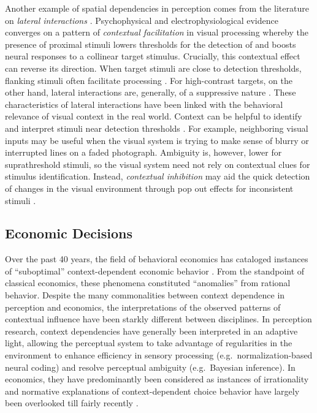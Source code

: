 \documentclass[a4paper, nobind]{templates/ociamthesis}
\begin{document}
Another example of spatial dependencies in perception comes from the literature on \emph{lateral interactions} \autocite{stemmler1995}. Psychophysical and electrophysiological evidence converges on a pattern of \emph{contextual facilitation} in visual processing whereby the presence of proximal stimuli lowers thresholds for the detection of \autocite{kapadia1995,freeman2001,freeman2005} and boosts neural responses to \autocite{kapadia1995,ito1999} a collinear target stimulus. Crucially, this contextual effect can reverse its direction. When target stimuli are close to detection thresholds, flanking stimuli often facilitate processing \autocite{polat1993}. For high-contrast targets, on the other hand, lateral interactions are, generally, of a suppressive nature \autocite{stemmler1995}. These characteristics of lateral interactions have been linked with the behavioral relevance of visual context in the real world. Context can be helpful to identify and interpret stimuli near detection thresholds \autocite{gilbert2000}. For example, neighboring visual inputs may be useful when the visual system is trying to make sense of blurry or interrupted lines on a faded photograph. Ambiguity is, however, lower for suprathreshold stimuli, so the visual system need not rely on contextual clues for stimulus identification. Instead, \emph{contextual inhibition} may aid the quick detection of changes in the visual environment through pop out effects for inconsistent stimuli \autocite{stemmler1995}.

\hypertarget{economic-decisions}{%
\subsection{Economic Decisions}\label{economic-decisions}}

Over the past 40 years, the field of behavioral economics has cataloged instances of ``suboptimal'' context-dependent economic behavior \autocite{thaler2015}. From the standpoint of classical economics, these phenomena constituted ``anomalies'' from rational behavior. Despite the many commonalities between context dependence in perception and economics, the interpretations of the observed patterns of contextual influence have been starkly different between disciplines. In perception research, context dependencies have generally been interpreted in an adaptive light, allowing the perceptual system to take advantage of regularities in the environment to enhance efficiency in sensory processing (e.g.~normalization-based neural coding) and resolve perceptual ambiguity (e.g.~Bayesian inference). In economics, they have predominantly been considered as instances of irrationality \autocite{kahneman1991} and normative explanations of context-dependent choice behavior have largely been overlooked till fairly recently \autocite{loewenstein2008}.
\end{document}
